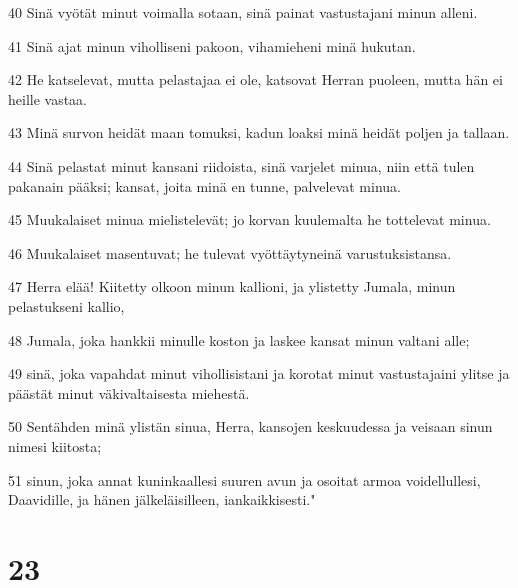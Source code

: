 \par 40 Sinä vyötät minut voimalla sotaan, sinä painat vastustajani minun alleni.
\par 41 Sinä ajat minun viholliseni pakoon, vihamieheni minä hukutan.
\par 42 He katselevat, mutta pelastajaa ei ole, katsovat Herran puoleen, mutta hän ei heille vastaa.
\par 43 Minä survon heidät maan tomuksi, kadun loaksi minä heidät poljen ja tallaan.
\par 44 Sinä pelastat minut kansani riidoista, sinä varjelet minua, niin että tulen pakanain pääksi; kansat, joita minä en tunne, palvelevat minua.
\par 45 Muukalaiset minua mielistelevät; jo korvan kuulemalta he tottelevat minua.
\par 46 Muukalaiset masentuvat; he tulevat vyöttäytyneinä varustuksistansa.
\par 47 Herra elää! Kiitetty olkoon minun kallioni, ja ylistetty Jumala, minun pelastukseni kallio,
\par 48 Jumala, joka hankkii minulle koston ja laskee kansat minun valtani alle;
\par 49 sinä, joka vapahdat minut vihollisistani ja korotat minut vastustajaini ylitse ja päästät minut väkivaltaisesta miehestä.
\par 50 Sentähden minä ylistän sinua, Herra, kansojen keskuudessa ja veisaan sinun nimesi kiitosta;
\par 51 sinun, joka annat kuninkaallesi suuren avun ja osoitat armoa voidellullesi, Daavidille, ja hänen jälkeläisilleen, iankaikkisesti."

\chapter{23}

